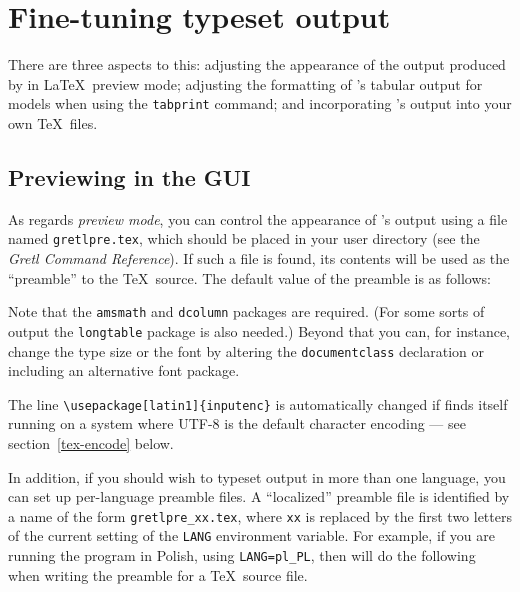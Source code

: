 \section{Fine-tuning typeset output}
\label{tex-tune}

There are three aspects to this: adjusting the appearance of the
output produced by  in \LaTeX\ preview mode; adjusting the
formatting of 's tabular output for models when using the
\texttt{tabprint} command; and incorporating 's output into
your own \TeX\ files.


\subsection{Previewing in the GUI}

As regards \emph{preview mode}, you can control the appearance of
's output using a file named \verb+gretlpre.tex+, which
should be placed in your  user directory (see the
\emph{Gretl Command Reference}).  If such a file is found, its
contents will be used as the ``preamble'' to the \TeX\ source.  The
default value of the preamble is as follows:
    

Note that the \verb+amsmath+ and \verb+dcolumn+ packages are required.
(For some sorts of output the \verb+longtable+ package is also
needed.)  Beyond that you can, for instance, change the type size or
the font by altering the \texttt{documentclass} declaration or
including an alternative font package.

The line \verb|\usepackage[latin1]{inputenc}| is automatically
changed if  finds itself running on a system where UTF-8
is the default character encoding --- see section~\ref{tex-encode}
below.

In addition, if you should wish to typeset  output in more
than one language, you can set up per-language preamble files.  A
``localized'' preamble file is identified by a name of the form
\verb|gretlpre_xx.tex|, where \texttt{xx} is replaced by the first two
letters of the current setting of the \texttt{LANG} environment
variable.  For example, if you are running the program in Polish,
using \verb|LANG=pl_PL|, then  will do the following when
writing the preamble for a \TeX\ source file.

